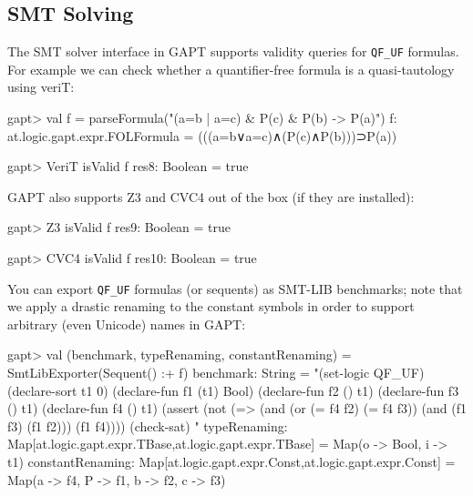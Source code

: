 \documentclass[a4paper,11pt]{article}
\begin{document}

\subsection{SMT Solving}

The SMT solver interface in GAPT supports validity queries for \verb,QF_UF,
formulas.  For example we can check whether a quantifier-free formula is a
quasi-tautology using veriT:
\begin{clilisting}
gapt> val f = parseFormula("(a=b | a=c) & P(c) & P(b) -> P(a)")
f: at.logic.gapt.expr.FOLFormula = (((a=b∨a=c)∧(P(c)∧P(b)))⊃P(a))

gapt> VeriT isValid f
res8: Boolean = true

\end{clilisting}

GAPT also supports Z3 and CVC4 out of the box (if they are installed):
\begin{clilisting}
gapt> Z3 isValid f
res9: Boolean = true

gapt> CVC4 isValid f
res10: Boolean = true

\end{clilisting}

You can export \verb,QF_UF, formulas (or sequents) as SMT-LIB benchmarks;
note that we apply a drastic renaming to the constant symbols in order to
support arbitrary (even Unicode) names in GAPT:
\begin{clilisting}
gapt> val (benchmark, typeRenaming, constantRenaming) = SmtLibExporter(Sequent() :+ f)
benchmark: String =
"(set-logic QF_UF)
(declare-sort t1 0)
(declare-fun f1 (t1) Bool)
(declare-fun f2 () t1)
(declare-fun f3 () t1)
(declare-fun f4 () t1)
(assert (not (=> (and (or (= f4 f2) (= f4 f3)) (and (f1 f3) (f1 f2))) (f1 f4))))
(check-sat)
"
typeRenaming: Map[at.logic.gapt.expr.TBase,at.logic.gapt.expr.TBase] = Map(o -> Bool, i -> t1)
constantRenaming: Map[at.logic.gapt.expr.Const,at.logic.gapt.expr.Const] = Map(a -> f4, P -> f1, b -> f2, c -> f3)

\end{clilisting}
\end{document}
